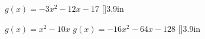 %
%

{
    $ g(x) = -3x^2 - 12x - 17 $
}[\normalsize]{3.9in}

\myProblems
{
    $ g(x) = x^2 - 10x$ 
}
{
    $ g(x) = -16x^2 - 64x - 128 $
}[\normalsize]{3.9in}
